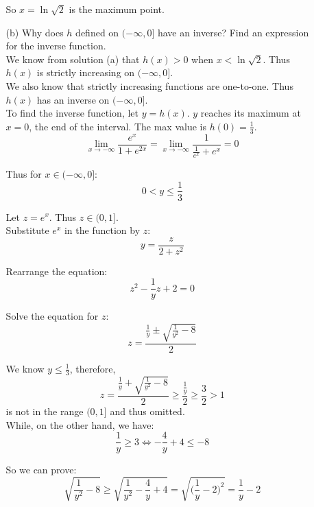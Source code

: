 \documentclass{article}
\begin{document}
\begin{enumerate}
\begin{enumerate}
            So $ x = \ln{\sqrt{2}} $ is the maximum point.\\
            
            \item[(b)] Why does $h$ defined on $(-\infty, 0]$ have an inverse? Find an expression for the inverse function. \\
            
            We know from solution (a) that $h(x)>0$ when $x<\ln{\sqrt{2}}$. Thus $h(x)$ is strictly increasing on $(-\infty, 0]$. \\
            
            We also know that strictly increasing functions are one-to-one. Thus $h(x)$ has an inverse on $(-\infty, 0]$. \\
            
            To find the inverse function, let $y=h(x)$. $y$ reaches its maximum at $x=0$, the end of the interval. The max value is $h(0) = \frac{1}{3}$.
            $$ \lim_{x \rightarrow -\infty}{ \frac{e^x}{1+e^{2x}} } 
              = \lim_{x \rightarrow -\infty}{ \frac{1}{\frac{1}{e^x}+e^x} } = 0 $$
            
            Thus for $x \in (-\infty, 0]$:
            $$ 0 < y \leq \frac{1}{3} $$
            
            Let $z=e^x$. Thus $z \in (0, 1]$.\\
            
            Substitute $e^x$ in the function by $z$:
            $$ y = \frac{z}{2 + z^2} $$
            
            Rearrange the equation:
            $$ z^2 - \frac{1}{y}z + 2 = 0$$
            
            Solve the equation for $z$:
            $$ z = \frac{ \frac{1}{y} \pm \sqrt{\frac{1}{y^2}-8} }{2} $$
            
            We know $y\leq \frac{1}{3}$, therefore,
            $$ z = \frac{ \frac{1}{y} + \sqrt{\frac{1}{y^2}-8} }{2} \geq \frac{\frac{1}{y}}{2} \geq \frac{3}{2} > 1 $$
            is not in the range $(0, 1]$ and thus omitted. \\
            
            While, on the other hand, we have:
            $$ \frac{1}{y} \geq 3 \Leftrightarrow -\frac{4}{y}+4 \leq -8 $$
            
            So we can prove:
            $$ \sqrt{\frac{1}{y^2}-8} \geq \sqrt{ \frac{1}{y^2}-\frac{4}{y}+4 } = 
               \sqrt{ \Bigg( \frac{1}{y}-2 \Bigg)^2 } = \frac{1}{y} - 2 $$
               

\end{enumerate}
\end{enumerate}
\end{document}
